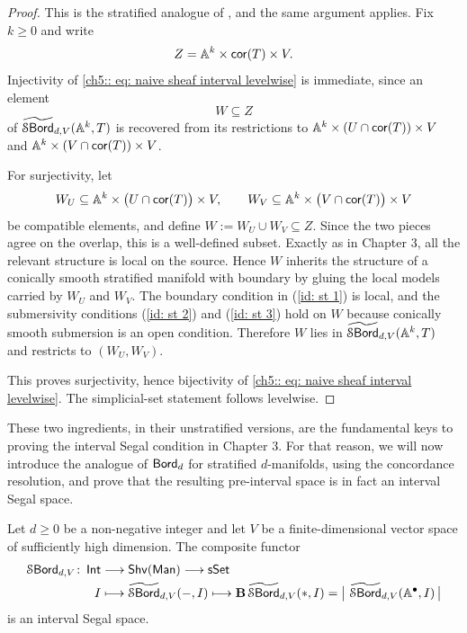 \begin{proof}
    This is the stratified analogue of , and the same argument applies. Fix $k\geq 0$ and write
    \begin{equation}
    Z = \mathbb A^{k}\times \operatorname{{\sf cor}}(T)\times V.
    \end{equation}
    Injectivity of \eqref{ch5:: eq: naive sheaf interval levelwise} is immediate, since an element
    \begin{equation}
    W\subseteq Z
    \end{equation}
    of $\operatorname{\widetilde{\mathcal S\mathsf{Bord}}}_{d,V}(\mathbb A^{k},T)$ is recovered from its restrictions to
    $\mathbb A^{k}\times(U\cap\operatorname{{\sf cor}}(T))\times V$ and
    $\mathbb A^{k}\times(V\cap\operatorname{{\sf cor}}(T))\times V$.

    For surjectivity, let
    \begin{equation}
    W_U\subseteq \mathbb A^{k}\times\big(U\cap\operatorname{{\sf cor}}(T)\big)\times V,\qquad
    W_V\subseteq \mathbb A^{k}\times\big(V\cap\operatorname{{\sf cor}}(T)\big)\times V
    \end{equation}
    be compatible elements, and define $W := W_U\cup W_V\subseteq Z$. Since the two pieces agree on the overlap, this is a well-defined subset. Exactly as in Chapter 3, all the relevant structure is local on the source. Hence $W$ inherits the structure of a conically smooth stratified manifold with boundary by gluing the local models carried by $W_U$ and $W_V$. The boundary condition in (\ref{id: st 1}) is local, and the submersivity conditions (\ref{id: st 2}) and (\ref{id: st 3}) hold on $W$ because conically smooth submersion is an open condition. Therefore $W$ lies in $\operatorname{\widetilde{\mathcal S\mathsf{Bord}}}_{d,V}(\mathbb A^{k},T)$ and restricts to $(W_U,W_V)$.

    This proves surjectivity, hence bijectivity of \eqref{ch5:: eq: naive sheaf interval levelwise}. The simplicial-set statement follows levelwise.
\end{proof}

These two ingredients, in their unstratified versions, are the fundamental keys to proving the interval Segal condition in Chapter 3. For that reason, we will now introduce the analogue of $\operatorname{\mathsf{Bord}}_d$ for stratified $d$-manifolds, using the concordance resolution, and prove that the resulting pre-interval space is in fact an interval Segal space.

\begin{theorem}\label{ch5:: thm: stratbord interval segal}
    Let $d \geq 0$ be a non-negative integer and let $V$ be a finite-dimensional vector space of sufficiently high dimension. The composite functor
    \begin{align}
        \operatorname{\mathcal S\mathsf{Bord}}_{d,V} \colon \operatorname{\mathsf{Int}} &\longrightarrow \operatorname{\sf Shv}(\operatorname{\sf Man})  \longrightarrow \operatorname{\sf sSet}  \\
         I &\longmapsto \operatorname{\widetilde{\mathcal S\mathsf{Bord}}}_{d,V}(-,I) \longmapsto \mathbf B\operatorname{\widetilde{\mathcal S\mathsf{Bord}}}_{d,V}(*,I) = \big|\,\operatorname{\widetilde{\mathcal S\mathsf{Bord}}}_{d,V}(\mathbb A^\bullet,I)\,\big| 
    \end{align}
    is an interval Segal space.
\end{theorem}

